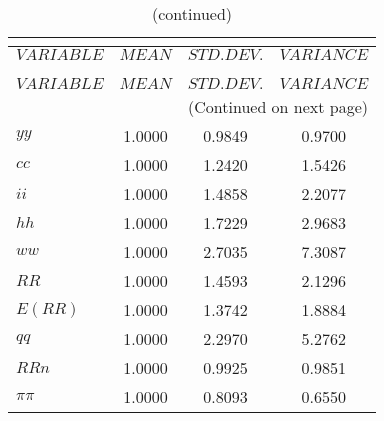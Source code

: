 
\begin{center}
\begin{longtable}{lccc} 
\caption{THEORETICAL MOMENTS}\\
 \label{Table:th_moments}\\
\toprule 
$VARIABLE  $	 & 	 $         MEAN$	 & 	 $    STD. DEV.$	 & 	 $     VARIANCE$\\
\midrule \endfirsthead 
\caption{(continued)}\\
 \toprule \\ 
$VARIABLE  $	 & 	 $         MEAN$	 & 	 $    STD. DEV.$	 & 	 $     VARIANCE$\\
\midrule \endhead 
\midrule \multicolumn{4}{r}{(Continued on next page)} \\ \bottomrule \endfoot 
\bottomrule \endlastfoot 
$yy        $	 & 	       1.0000	 & 	       0.9849	 & 	       0.9700 \\ 
$cc        $	 & 	       1.0000	 & 	       1.2420	 & 	       1.5426 \\ 
$ii        $	 & 	       1.0000	 & 	       1.4858	 & 	       2.2077 \\ 
$hh        $	 & 	       1.0000	 & 	       1.7229	 & 	       2.9683 \\ 
$ww        $	 & 	       1.0000	 & 	       2.7035	 & 	       7.3087 \\ 
$RR        $	 & 	       1.0000	 & 	       1.4593	 & 	       2.1296 \\ 
$E(RR)     $	 & 	       1.0000	 & 	       1.3742	 & 	       1.8884 \\ 
$qq        $	 & 	       1.0000	 & 	       2.2970	 & 	       5.2762 \\ 
$RRn       $	 & 	       1.0000	 & 	       0.9925	 & 	       0.9851 \\ 
$\pi\pi    $	 & 	       1.0000	 & 	       0.8093	 & 	       0.6550 \\ 
\end{longtable}
 \end{center}

